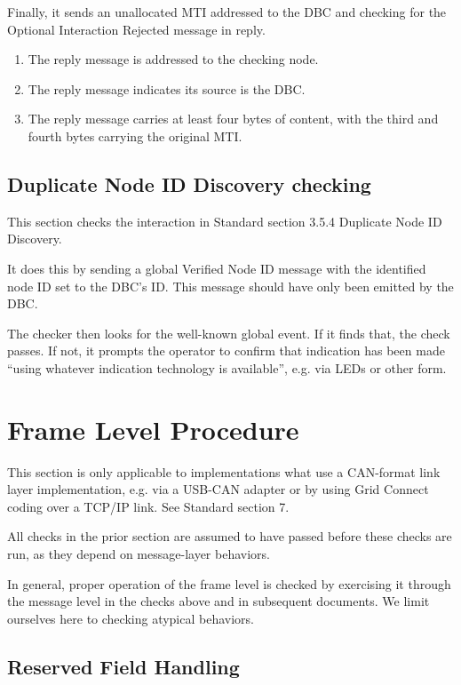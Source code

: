Finally, it sends an unallocated MTI
addressed to the DBC and checking for the Optional Interaction Rejected 
message in reply.

    \begin{enumerate}
    \item The reply message is addressed to the checking node.
    \item The reply message indicates its source is the DBC.
    \item The reply message carries at least four bytes of content, with the 
            third and fourth bytes carrying the original MTI.
    \end{enumerate}

\subsection{Duplicate Node ID Discovery checking}

This section checks the interaction in Standard section 3.5.4 Duplicate Node ID Discovery.

It does this by sending a global Verified Node ID message with the 
identified node ID set to the DBC's ID. This message should have
only been emitted by the DBC.

The checker then looks for the well-known global event.  If it finds that, the check passes.
If not, it prompts the operator to confirm that indication has been made 
``using whatever indication technology is available'', e.g. via LEDs or other form.

\section{Frame Level Procedure}

This section is only applicable to implementations what use a CAN-format link layer
implementation, e.g. via a USB-CAN adapter or by using Grid Connect coding
over a TCP/IP link. See Standard section 7.

All checks in the prior section are assumed to have passed before these
checks are run, as they depend on message-layer behaviors.

In general, proper operation of the frame level is checked by 
exercising it through the message level in the checks above and in subsequent 
documents.  We limit ourselves here to checking atypical behaviors.

\subsection{Reserved Field Handling}

